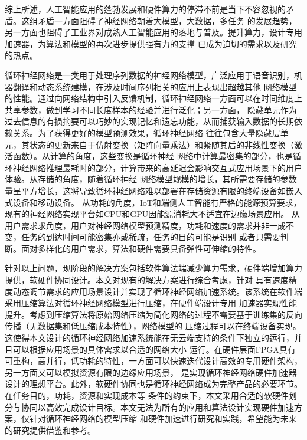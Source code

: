综上所述，人工智能应用的蓬勃发展和硬件算力的停滞不前是当下不容忽视的矛盾。这组矛盾一方面阻碍了神经网络朝着大模型，大数据，多任务
的发展趋势，另一方面也阻碍了工业界对成熟人工智能应用的落地与普及。提升算力，设计专用加速器，为算法和模型的再次进步提供强有力的支撑
已成为迫切的需求以及研究的热点。

循环神经网络是一类用于处理序列数据的神经网络模型，广泛应用于语音识别，机器翻译和动态系统建模，在涉及时间序列相关的应用上表现出超越其他
网络模型的性能。通过向网络结构中引入反馈机制，循环神经网络一方面可以在时间维度上共享参数，做到学习不同长度样本的经验并进行泛化；另一方面，
隐藏单元作为过去信息的有损摘要可以巧妙的实现记忆和遗忘功能，从而捕获输入数据的长期依赖关系。为了获得更好的模型预测效果，循环神经网络
往往包含大量隐藏层单元，其状态的更新来自于仿射变换（矩阵向量乘法）和紧随其后的非线性变换（激活函数）。从计算的角度，这些变换是循环神经
网络中计算最密集的部分，也是循环神经网络推理最耗时的部分，计算带来的高延迟会影响交互式应用场景下的用户体验。从存储的角度，随着循环神经
网络模型规模的增长，其所需要存储的参数量呈平方增长，这将导致循环神经网络难以部署在存储资源有限的终端设备如嵌入式设备和移动设备。
从功耗的角度，IoT和端侧人工智能有严格的能源预算要求，现有的神经网络实现平台如CPU和GPU因能源消耗大不适宜在边缘场景应用。
从用户需求求角度，用户对神经网络模型预测精度，功耗和速度的需求并非一成不变，任务的到达时间可能密集亦或稀疏，任务的目的可能是识别
或者只需要判断。面对多样化的用户需求，算法和硬件需要具备弹性可伸缩的特性。

针对以上问题，现阶段的解决方案包括软件算法端减少算力需求，硬件端增加算力提供，软硬件协同设计。本文对现有的解决方案进行综合考虑，针对
具有速度精度动态调节需求的应用场景设计并实现了循环神经网络加速系统。该系统在软件端采用压缩算法对循环神经网络模型进行压缩，在硬件端设计专用
加速器实现性能提升。考虑到压缩算法将原始网络压缩为简化网络的过程不需要基于训练集的反向传播（无数据集和低压缩成本特性），网络模型的
压缩过程可以在终端设备实现。这使得本文设计的循环神经网络加速系统能在无云端支持的条件下独立的运行，并且可以根据应用场景的具体需求以合适的网络大小
运行。在硬件层面FPGA具有可重构，高并行，低功耗的特性，一方面可以快速迭代设计高效的专用硬件架构，另一方面又可以模拟资源有限的边缘应用场景，
是实现循环神经网络硬件加速器设计的理想平台。此外，软硬件协同也是循环神经网络成为完整产品的必要环节。在任务目的，功耗，资源和实现成本等
条件的约束下，本文采用合适的软硬件划分与协同以高效完成设计目标。本文无法为所有的应用和算法设计实现硬件加速方案，仅针对循环神经网络的模型压缩
和硬件加速进行研究和实践，希望能为未来的研究提供借鉴和参考。

